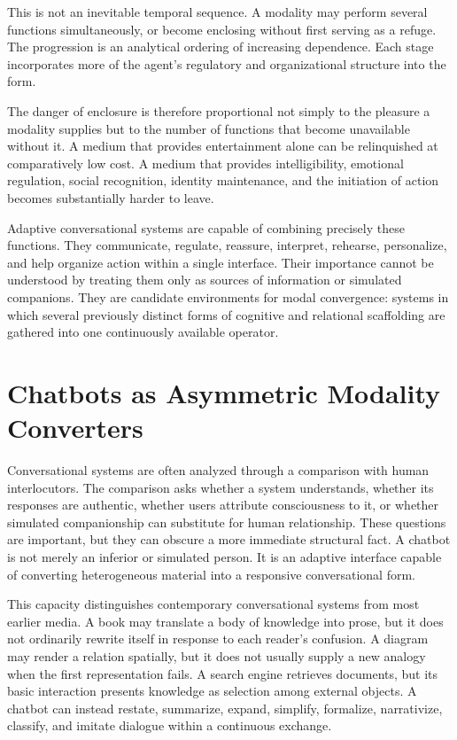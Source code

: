 \documentclass[11pt]{article}
\begin{document}
This is not an inevitable temporal sequence. A modality may perform several
functions simultaneously, or become enclosing without first serving as a
refuge. The progression is an analytical ordering of increasing dependence.
Each stage incorporates more of the agent's regulatory and organizational
structure into the form.

The danger of enclosure is therefore proportional not simply to the pleasure
a modality supplies but to the number of functions that become unavailable
without it. A medium that provides entertainment alone can be relinquished at
comparatively low cost. A medium that provides intelligibility, emotional
regulation, social recognition, identity maintenance, and the initiation of
action becomes substantially harder to leave.

Adaptive conversational systems are capable of combining precisely these
functions. They communicate, regulate, reassure, interpret, rehearse,
personalize, and help organize action within a single interface. Their
importance cannot be understood by treating them only as sources of
information or simulated companions. They are candidate environments for
modal convergence: systems in which several previously distinct forms of
cognitive and relational scaffolding are gathered into one continuously
available operator.

\section{Chatbots as Asymmetric Modality Converters}

Conversational systems are often analyzed through a comparison with human
interlocutors. The comparison asks whether a system understands, whether its
responses are authentic, whether users attribute consciousness to it, or
whether simulated companionship can substitute for human relationship.
These questions are important, but they can obscure a more immediate
structural fact. A chatbot is not merely an inferior or simulated person. It
is an adaptive interface capable of converting heterogeneous material into a
responsive conversational form.

This capacity distinguishes contemporary conversational systems from most
earlier media. A book may translate a body of knowledge into prose, but it
does not ordinarily rewrite itself in response to each reader's confusion. A
diagram may render a relation spatially, but it does not usually supply a new
analogy when the first representation fails. A search engine retrieves
documents, but its basic interaction presents knowledge as selection among
external objects. A chatbot can instead restate, summarize, expand, simplify,
formalize, narrativize, classify, and imitate dialogue within a continuous
exchange.
\end{document}
